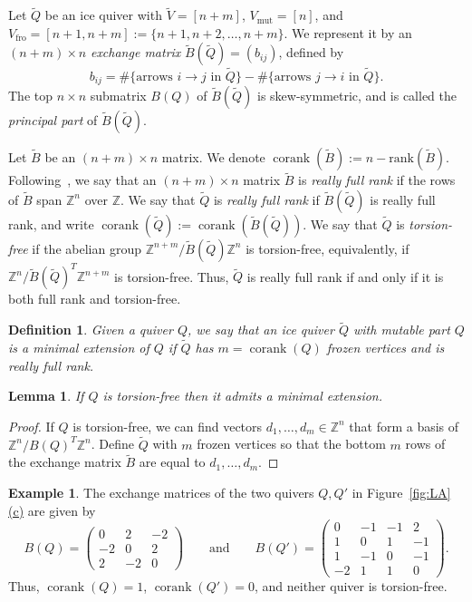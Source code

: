 \documentclass[11pt]{article}
\newtheorem{definition}[theo]{Definition}
\newtheorem{lemma}[theo]{Lemma}
\theoremstyle{definition}
\newtheorem{example}[theo]{Example}
\numberwithin{equation}{section}
\newcommand\Z{\mathbb{Z}}
\newcommand\rk{{\mathrm{rank}}}
\newcommand\cork{ \operatorname{corank}}
\newcommand\Qice{\widetilde{Q}}
\newcommand\BQ{B(Q)}
\newcommand\BQice{\widetilde{B}(\Qice)}
\newcommand\Vice{\widetilde{V}}
\newcommand\fro{\operatorname{fro}}
\newcommand\mut{\operatorname{mut}}
\newcommand\Vfro{V_{\fro}}
\newcommand\Vmut{V_{\mut}}
\newcommand\Bice{\widetilde{B}}
\def\figref#1(#2){Figure~\hyperref[#1]{\ref*{#1}(#2)}}
\begin{document}
 Let $\Qice$ be an ice quiver with $\Vice=[n+m]$, $\Vmut=[n]$, and $\Vfro=[n+1,n+m]:=\{n+1,n+2,\dots,n+m\}$. We represent it by an $(n+m)\times n$ \emph{exchange matrix} $\BQice=(b_{ij})$, defined by
 \begin{equation*}%
   b_{ij}=\#\{\text{arrows $i\to j$ in $\Qice$}\} - \#\{\text{arrows $j\to i$ in $\Qice$}\}.
 \end{equation*}
The top $n\times n$ submatrix $\BQ$ of $\BQice$ is skew-symmetric, and is called the \emph{principal part} of $\BQice$.  
%

%
%
%
%
%
%
%
%
%
%
%
%
%
%
%
%
 
%

Let $\Bice$ be an $(n+m)\times n$ matrix. We denote $\cork(\Bice):=n-\rk(\Bice)$. Following~\cite{LS}, we say that an $(n+m)\times n$ matrix $\Bice$ is \emph{really full rank} if the rows of $\Bice$ span $\Z^n$ over $\Z$. We say that $\Qice$ is \emph{really full rank} if $\BQice$ is really full rank, and write $\cork(\Qice):=\cork(\BQice)$.   We say that $\Qice$ is \emph{torsion-free} if the abelian group $\Z^{n+m}/\BQice \Z^n$ is torsion-free, equivalently, if $\Z^n/\BQice^T \Z^{n+m}$ is torsion-free.  Thus, $\Qice$ is really full rank if and only if it is both full rank and torsion-free.

\begin{definition}
Given a quiver $Q$, we say that an ice quiver $\Qice$ with mutable part $Q$ is a \emph{minimal extension} of $Q$ if $\Qice$ has $m=\cork(Q)$ frozen vertices and is really full rank.
\end{definition}

\begin{lemma}\label{lem:ext}
If $Q$ is torsion-free then it admits a minimal extension.
%
\end{lemma}
\begin{proof}
If $Q$ is torsion-free, we can find vectors $d_1,\ldots,d_m \in \Z^n$ that form a basis of $\Z^n/B(Q)^T \Z^n$.  Define $\Qice$ with $m$ frozen vertices so that the bottom $m$ rows of the exchange matrix $\Bice$ are equal to $d_1,\ldots,d_m$.
\end{proof}
%
%

\begin{example}
The exchange matrices of the two quivers $Q,Q'$ in \figref{fig:LA}(c) are given by
$$
\BQ=\begin{pmatrix}
0 & 2 & -2 \\
-2&0&2\\
2&-2&0
\end{pmatrix} \qquad \text{and} \qquad
B(Q')=\begin{pmatrix}
0 & -1& -1 &2 \\
1&0&1 &-1\\
1&-1&0 &-1 \\
-2&1&1&0
\end{pmatrix}.
$$
Thus, $\cork(Q)=1$, $\cork(Q')=0$, and neither quiver is torsion-free.
\end{example}
\end{document}
